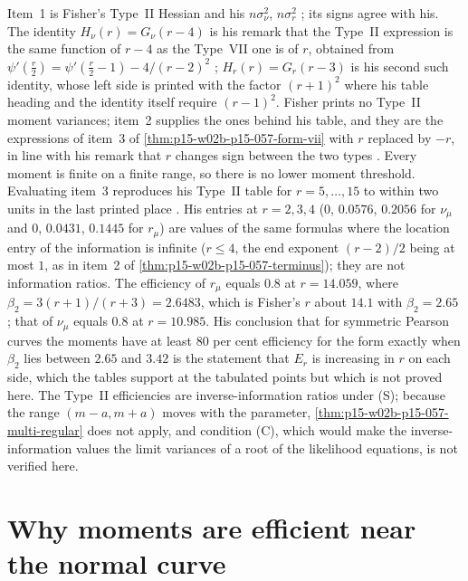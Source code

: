 Item~1 is Fisher's Type~II Hessian and his \(n\sigma_\nu^2\),
\(n\sigma_r^2\) \cite[p.~354]{Fisher1922Foundations}; its signs agree with
his. The identity \(H_\nu(r)=G_\nu(r-4)\) is his remark that the Type~II
expression is the same function of \(r-4\) as the Type~VII one is of
\(r\), obtained from \(\psi'(\frac r2)=\psi'(\frac r2-1)-4/(r-2)^2\)
\cite[p.~354]{Fisher1922Foundations}; \(H_r(r)=G_r(r-3)\) is his second
such identity, whose left side is printed with the factor
\((r+1)^2\) where his table heading and the identity itself require
\((r-1)^2\). Fisher prints no Type~II moment variances; item~2 supplies
the ones behind his table, and they are the expressions of item~3 of
\cref{thm:p15-w02b-p15-057-form-vii} with \(r\) replaced by \(-r\), in
line with his remark that \(r\) changes sign between the two types
\cite[p.~355]{Fisher1922Foundations}. Every moment is finite on a finite
range, so there is no lower moment threshold. Evaluating item~3
reproduces his Type~II table for \(r=5,\ldots,15\) to within two units
in the last printed place \cite[p.~355]{Fisher1922Foundations}. His
entries at \(r=2,3,4\) (\(0\), \(0.0576\), \(0.2056\) for \(\nu_\mu\) and
\(0\), \(0.0431\), \(0.1445\) for \(r_\mu\)) are values of the same
formulas where the location entry of the information is infinite
(\(r\leq4\), the end exponent \((r-2)/2\) being at most \(1\), as in
item~2 of \cref{thm:p15-w02b-p15-057-terminus}); they are not information
ratios. The efficiency of \(r_\mu\) equals \(0.8\) at \(r=14.059\), where
\(\beta_2=3(r+1)/(r+3)=2.6483\), which is Fisher's \(r\) about \(14.1\)
with \(\beta_2=2.65\) \cite[p.~355]{Fisher1922Foundations}; that of
\(\nu_\mu\) equals \(0.8\) at \(r=10.985\). His conclusion that for
symmetric Pearson curves the moments have at least 80 per cent efficiency
for the form exactly when \(\beta_2\) lies between \(2.65\) and \(3.42\)
\cite[p.~355]{Fisher1922Foundations} is the statement that \(E_r\) is
increasing in \(r\) on each side, which the tables support at the
tabulated points but which is not proved here. The Type~II efficiencies
are inverse-information ratios under (S); because the range
\((m-a,m+a)\) moves with the parameter,
\cref{thm:p15-w02b-p15-057-multi-regular} does not apply, and condition
(C), which would make the inverse-information values the limit variances
of a root of the likelihood equations, is not verified here.

\section{Why moments are efficient near the normal curve}
\label{sec:p15-w02b-p15-057-near-normal}

